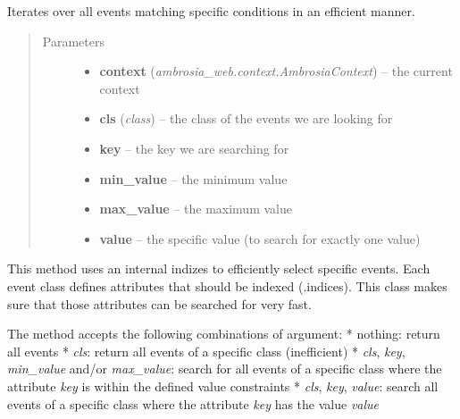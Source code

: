 \documentclass[letterpaper,10pt,english]{sphinxmanual}
\begin{document}
\begin{fulllineitems}
\begin{fulllineitems}
\begin{quote}
\begin{description}
\end{description}\end{quote}

\end{fulllineitems}


\begin{fulllineitems}
\label{ambrosia.model:ambrosia.model.Analysis.iter_events}
Iterates over all events matching specific conditions in an efficient manner.
\begin{quote}\begin{description}
\item[{Parameters}] \leavevmode\begin{itemize}
\item {} 
\textbf{context} (\emph{ambrosia\_web.context.AmbrosiaContext}) -- the current context

\item {} 
\textbf{cls} (\emph{class}) -- the class of the events we are looking for

\item {} 
\textbf{key} -- the key we are searching for

\item {} 
\textbf{min\_value} -- the minimum value

\item {} 
\textbf{max\_value} -- the maximum value

\item {} 
\textbf{value} -- the specific value (to search for exactly one value)

\end{itemize}

\end{description}\end{quote}

This method uses an internal indizes to efficiently select specific events. Each event class defines attributes
that should be indexed ({\hyperref[ambrosia.model:ambrosia.model.Event]{}}.indices). This class makes sure that those attributes can be searched for
very fast.

The method accepts the following combinations of argument:
* nothing: return all events
* \emph{cls}: return all events of a specific class (inefficient)
* \emph{cls}, \emph{key}, \emph{min\_value} and/or \emph{max\_value}: search for all events of a specific class where the attribute
\emph{key} is within the defined value constraints
* \emph{cls}, \emph{key}, \emph{value}: search all events of a specific class where the attribute \emph{key} has the value \emph{value}


\end{fulllineitems}
\end{fulllineitems}
\end{document}
